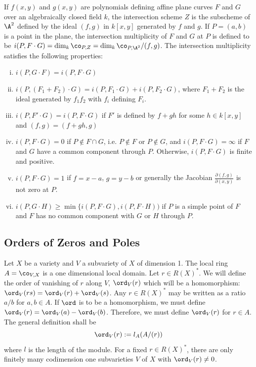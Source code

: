 \begin{ex}
If $f(x,y)$ and $g(x,y)$ are polynomials defining affine plane curves $F$ and $G$ over an algebraically closed field $k$, the intersection scheme $Z$ is the subscheme of $\A^2$ defined by the ideal $(f,g)$ in $k[x,y]$ generated by $f$ and $g$. If $P=(a,b)$ is a point in the plane, the intersection multiplicity of $F$ and $G$ at $P$ is defined to be $i(P,F \cdot G)=\dim_k \co_{P,Z}=\dim_k \co_{P,\A^2}/(f,g)$. The intersection multiplicity satisfies the following properties:
	\begin{enumerate}[(i)]
	\item $i(P, G\cdot F) = i(P, F \cdot G)$
	\item $i(P,(F_1+F_2)\cdot G)=i(P,F_1 \cdot G)+i(P,F_2 \cdot G)$, where $F_1+F_2$ is the ideal generated by $f_1f_2$ with $f_i$ defining $F_i$. 
	\item $i(P, F' \cdot G) = i(P, F \cdot G)$ if $F'$ is defined by $f+gh$ for some $h \in k[x,y]$ and $(f,g)=(f+gh,g)$
	\item $i(P,F \cdot G)=0$ if $P \notin F \cap G$, i.e. $P \notin F$ or $P \notin G$, and $i(P, F\cdot G)=\infty$ if $F$ and $G$ have a common component through $P$. Otherwise, $i(P, F \cdot G)$ is finite and positive. 
	\item $i(P,F \cdot G)=1$ if $f=x-a$, $g=y-b$ or generally the Jacobian $\frac{\partial(f,g)}{\partial(x,y)}$ is not zero at $P$.
	\item $i(P, G \cdot H) \geq \min\{i(P, F\cdot G), i(P, F\cdot H))$ if $P$ is a simple point of $F$ and $F$ has no common component with $G$ or $H$ through $P$.
	\end{enumerate}
\end{ex}


\subsection{Orders of Zeros and Poles}


Let $X$ be a variety and $V$ a subvariety of $X$ of dimension 1. The local ring $A=\co_{V,X}$ is a one dimensional local domain. Let $r \in R(X)^*$. We will define the order of vanishing of $r$ along $V$, $\ord_V(r)$ which will be a homomorphism: $\ord_V(rs)=\ord_V(r)+\ord_V(s)$. Any $r \in R(X)^*$ may be written as a ratio $a/b$ for $a,b \in A$. If $\ord$ is to be a homomorphism, we must define $\ord_V(r)=\ord_V(a)-\ord_V(b)$. Therefore, we must define $\ord_V(r)$ for $r \in A$. The general definition shall be 
	\[
	\ord_V(r):= l_A(A/(r))
	\]
where $l$ is the length of the module. For a fixed $r \in R(X)^*$, there are only finitely many codimension one subvarieties $V$ of $X$ with $\ord_V(r) \neq 0$. 


